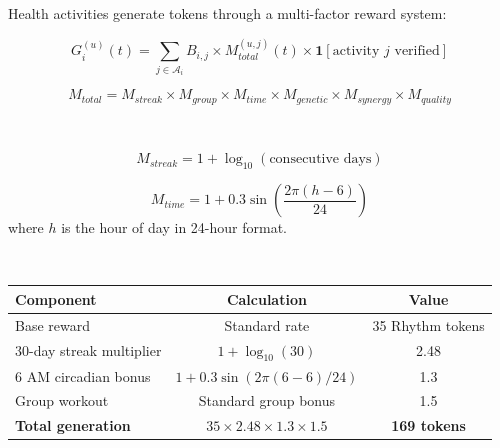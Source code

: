 \documentclass[11pt,letterpaper]{article}
\begin{document}
Health activities generate tokens through a multi-factor reward system:

\begin{equation}
G_i^{(u)}(t) = \sum_{j \in \mathcal{A}_i} B_{i,j} \times M_{total}^{(u,j)}(t) \times \mathbf{1}[\text{activity } j \text{ verified}]
\end{equation}


\begin{equation}
M_{total} = M_{streak} \times M_{group} \times M_{time} \times M_{genetic} \times M_{synergy} \times M_{quality}
\end{equation}


~

\begin{equation}
M_{streak} = 1 + \log_{10}(\text{consecutive days})
\end{equation}

\begin{equation}
M_{time} = 1 + 0.3\sin\left(\frac{2\pi(h - 6)}{24}\right)
\end{equation}
where $h$ is the hour of day in 24-hour format.

~


\begin{table}[H]
\centering
\begin{tabular}{lcc}
\toprule
\textbf{Component} & \textbf{Calculation} & \textbf{Value} \\
\midrule
Base reward & Standard rate & 35 Rhythm tokens \\
30-day streak multiplier & $1 + \log_{10}(30)$ & 2.48 \\
6 AM circadian bonus & $1 + 0.3\sin(2\pi(6-6)/24)$ & 1.3 \\
Group workout & Standard group bonus & 1.5 \\
\midrule
\textbf{Total generation} & $35 \times 2.48 \times 1.3 \times 1.5$ & \textbf{169 tokens} \\
\bottomrule
\end{tabular}
\end{table}
\end{document}
